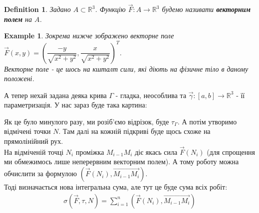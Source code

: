 \documentclass[a4paper, 10pt]{article}
\theoremstyle{theoremdd}
\theoremstyle{theoremdd}
\newtheorem{definition}[theorem]{Definition}
\theoremstyle{theoremdd}
\theoremstyle{theoremdd}
\newtheorem{example}[theorem]{Example}
\theoremstyle{theoremdd}
\theoremstyle{theoremdd}
\theoremstyle{theoremdd}
\theoremstyle{theoremdd}
\begin{document}
\begin{definition}
Задано $A \subset \mathbb{R}^3$. Функцію $\vec{F}: A \to \mathbb{R}^3$ будемо називати \textbf{векторним полем} на $A$.
\end{definition}

\begin{example}
Зокрема нижче зображено векторне поле $\vec{F}(x,y) = \left( \dfrac{-y}{\sqrt{x^2+y^2}}, \dfrac{x}{\sqrt{x^2+y^2}} \right)^T$.\\
Векторне поле - це шось на кшталт \textit{сили}, які діють на фізичне тіло в даному положені.
\end{example}

\begin{figure}[H]
\centering
{}
\end{figure}

А тепер нехай задана деяка крива $\Gamma$ - гладка, неособлива та $\vec{\gamma}: [a,b] \to \mathbb{R}^3$ - її параметризація. У нас зараз буде така картина:

\begin{figure}[H]
\centering
{}
\end{figure}
Як це було минулого разу, ми розіб'ємо відрізок, буде $\tau_\Gamma$. А потім утворимо відмічені точки $N$. Там далі на кожній підкриві буде щось схоже на прямолінійний рух.\\
На відміченій точці $N_i$ проміжка $M_{i-1}M_i$ діє якась сила $\vec{F}(N_i)$ (для спрощення ми обмежимось лише неперервним векторним полем). А тому роботу можна обчислити за формулою $( \vec{F}(N_i), \overrightarrow{M_{i-1}M_i} )$.\\
Тоді визначається нова інтегральна сума, але тут це буде сума всіх робіт:
\begin{align*}
\sigma(\vec{F},\tau,N) = \displaystyle\sum_{i=1}^n \left( \vec{F}(N_i), \overrightarrow{M_{i-1}M_i} \right)
\end{align*}
\end{document}
